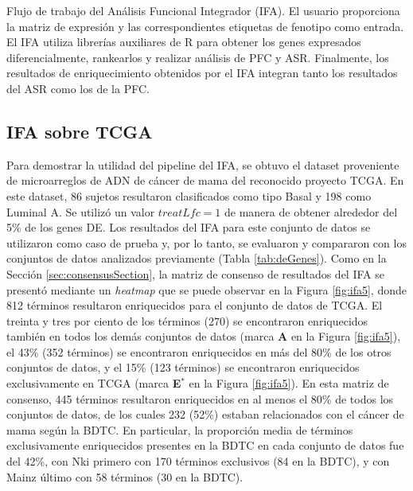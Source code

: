 \documentclass[12pt,twoside]{reedthesis}
\begin{document}
Flujo de trabajo del Análisis Funcional Integrador (IFA). El usuario proporciona la matriz de expresión y las correspondientes etiquetas de fenotipo como entrada. El IFA utiliza librerías auxiliares de R para obtener los genes expresados diferencialmente, rankearlos y realizar análisis de PFC y ASR. Finalmente, los resultados de enriquecimiento obtenidos por el IFA integran tanto los resultados del ASR como los de la PFC.



\hypertarget{ifa-sobre-tcga}{%
\subsection{IFA sobre TCGA}\label{ifa-sobre-tcga}}

\par

Para demostrar la utilidad del pipeline del IFA, se obtuvo el dataset proveniente de microarreglos de ADN de cáncer de mama del reconocido proyecto TCGA. En este dataset, 86 sujetos resultaron clasificados como tipo Basal y 198 como Luminal A. Se utilizó un valor \(treatLfc=1\) de manera de obtener alrededor del 5\% de los genes DE. Los resultados del IFA para este conjunto de datos se utilizaron como caso de prueba y, por lo tanto, se evaluaron y compararon con los conjuntos de datos analizados previamente (Tabla \ref{tab:deGenes}). Como en la Sección \ref{sec:consensusSection}, la matriz de consenso de resultados del IFA se presentó mediante un \emph{heatmap} que se puede observar en la Figura \ref{fig:ifa5}, donde 812 términos resultaron enriquecidos para el conjunto de datos de TCGA. El treinta y tres por ciento de los términos (270) se encontraron enriquecidos también en todos los demás conjuntos de datos (marca \textbf{A} en la Figura \ref{fig:ifa5}), el 43\% (352 términos) se encontraron enriquecidos en más del 80\% de los otros conjuntos de datos, y el 15\% (123 términos) se encontraron enriquecidos exclusivamente en TCGA (marca \textbf{E\(^*\)} en la Figura \ref{fig:ifa5}). En esta matriz de consenso, 445 términos resultaron enriquecidos en al menos el 80\% de todos los conjuntos de datos, de los cuales 232 (52\%) estaban relacionados con el cáncer de mama según la BDTC. En particular, la proporción media de términos exclusivamente enriquecidos presentes en la BDTC en cada conjunto de datos fue del 42\%, con Nki primero con 170 términos exclusivos (84 en la BDTC), y con Mainz último con 58 términos (30 en la BDTC).

\par
\end{document}
